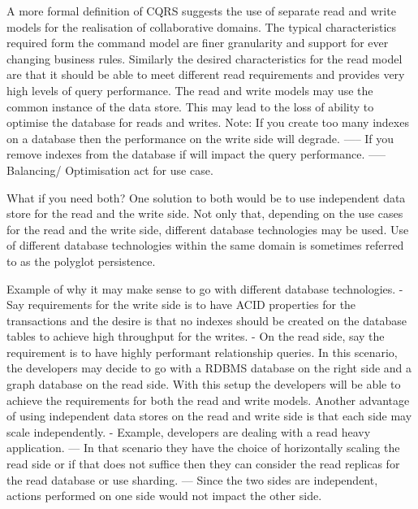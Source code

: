 A more formal definition of CQRS suggests the use of separate read and write models for the realisation of collaborative domains.
The typical characteristics required form the command model are finer granularity and support for ever changing business rules.
Similarly the desired characteristics for the read model are that it should be able to meet different read requirements and provides very high levels of query performance.
The read and write models may use the common instance of the data store.
This may lead to the loss of ability to optimise the database for reads and writes.
Note: If you create too many indexes on a database then the performance on the write side will degrade.
----- If you remove indexes from the database if will impact the query performance.
----- Balancing/ Optimisation act for use case.

What if you need both?
One solution to both would be to use independent data store for the read and the write side.
Not only that, depending on the use cases for the read and the write side, different database technologies may be used.
Use of different database technologies within the same domain is sometimes referred to as the polyglot persistence.

Example of why it may make sense to go with different database technologies.
- Say requirements for the write side is to have ACID properties for the transactions and the desire is that no indexes should be created on the database tables to achieve high throughput for the writes.
- On the read side, say the requirement is to have highly performant relationship queries.
In this scenario, the developers may decide to go with a RDBMS database on the right side and a graph database on the read side.
With this setup the developers will be able to achieve the requirements for both the read and write models.
Another advantage of using independent data stores on the read and write side is that each side may scale independently.
- Example, developers are dealing with a read heavy application.
--- In that scenario they have the choice of horizontally scaling the read side or if that does not suffice then they can consider the read replicas for the read database or use sharding.
--- Since the two sides are independent, actions performed on one side would not impact the other side.

